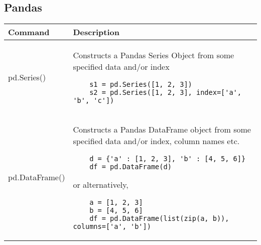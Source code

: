 \documentclass[]{article}
\begin{document}
    \subsection{Pandas}
    \begin{longtable}{| m{6cm}  | m{11cm} |}
    \hline
    \textbf{Command} & \textbf{Description} 
    \\\hline
    pd.Series() & Constructs a Pandas Series Object from some specified data and/or index
    \begin{verbatim}
    s1 = pd.Series([1, 2, 3])
    s2 = pd.Series([1, 2, 3], index=['a', 'b', 'c'])
    \end{verbatim}
    \\\hline
    pd.DataFrame() & Constructs a Pandas DataFrame object from some specified data and/or index, column names etc.
    \begin{verbatim}
    d = {'a' : [1, 2, 3], 'b' : [4, 5, 6]}
    df = pd.DataFrame(d)
    \end{verbatim}
    or alternatively, 
    \begin{verbatim}
    a = [1, 2, 3]
    b = [4, 5, 6]
    df = pd.DataFrame(list(zip(a, b)), columns=['a', 'b'])
    \end{verbatim}
    \\\hline
    \end{longtable}
\end{document}

